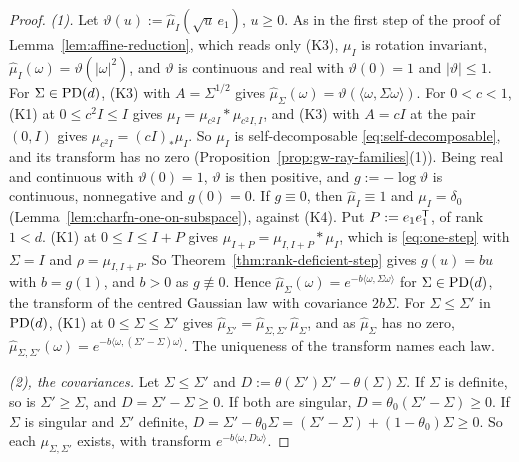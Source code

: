 \begin{proof}
\emph{(1).} Let $\vartheta(u) := \widehat\mu_I(\sqrt u\,e_1)$, $u \ge 0$. As in the first step of the proof of
Lemma~\ref{lem:affine-reduction}, which reads only (K3), $\mu_I$ is rotation invariant,
$\widehat\mu_I(\omega) = \vartheta(|\omega|^2)$, and $\vartheta$ is continuous and real with $\vartheta(0) = 1$
and $|\vartheta| \le 1$. For $\Sigma \in \mathrm{PD}(d)$, (K3) with $A = \Sigma^{1/2}$ gives
$\widehat\mu_\Sigma(\omega) = \vartheta(\langle\omega,\Sigma\omega\rangle)$. For $0 < c < 1$, (K1) at
$0 \le c^2I \le I$ gives $\mu_I = \mu_{c^2I} * \mu_{c^2I,I}$, and (K3) with $A = cI$ at the pair $(0, I)$
gives $\mu_{c^2I} = (cI)_*\mu_I$. So $\mu_I$ is self-decomposable \ref{eq:self-decomposable}, and its
transform has no zero (Proposition~\ref{prop:gw-ray-families}(1)). Being real and continuous with $\vartheta(0) = 1$,
$\vartheta$ is then positive, and $g := -\log\vartheta$ is continuous, nonnegative and $g(0) = 0$. If
$g \equiv 0$, then $\widehat\mu_I \equiv 1$ and $\mu_I = \delta_0$ (Lemma~\ref{lem:charfn-one-on-subspace}), against
(K4). Put $P := e_1e_1^{\mathsf{T}}$, of rank $1 < d$. (K1) at $0 \le I \le I + P$ gives
$\mu_{I+P} = \mu_{I,I+P} * \mu_I$, which is \ref{eq:one-step} with $\Sigma = I$ and $\rho = \mu_{I,I+P}$. So
Theorem~\ref{thm:rank-deficient-step} gives $g(u) = bu$ with $b = g(1)$, and $b > 0$ as $g \not\equiv 0$. Hence
$\widehat\mu_\Sigma(\omega) = e^{-b\langle\omega,\Sigma\omega\rangle}$ for $\Sigma \in \mathrm{PD}(d)$, the transform of
the centred Gaussian law with covariance $2b\Sigma$. For $\Sigma \le \Sigma'$ in $\mathrm{PD}(d)$, (K1) at
$0 \le \Sigma \le \Sigma'$ gives $\widehat\mu_{\Sigma'} = \widehat\mu_{\Sigma,\Sigma'}\,\widehat\mu_\Sigma$, and as
$\widehat\mu_\Sigma$ has no zero, $\widehat\mu_{\Sigma,\Sigma'}(\omega) = e^{-b\langle\omega,(\Sigma'-\Sigma)\omega\rangle}$.
The uniqueness of the transform names each law.

\emph{(2), the covariances.} Let $\Sigma \le \Sigma'$ and $D := \theta(\Sigma')\Sigma' - \theta(\Sigma)\Sigma$. If
$\Sigma$ is definite, so is $\Sigma' \ge \Sigma$, and $D = \Sigma' - \Sigma \ge 0$. If both are singular,
$D = \theta_0(\Sigma' - \Sigma) \ge 0$. If $\Sigma$ is singular and $\Sigma'$ definite,
$D = \Sigma' - \theta_0\Sigma = (\Sigma' - \Sigma) + (1 - \theta_0)\Sigma \ge 0$. So each $\mu_{\Sigma,\Sigma'}$ exists,
with transform $e^{-b\langle\omega,D\omega\rangle}$.


\end{proof}
